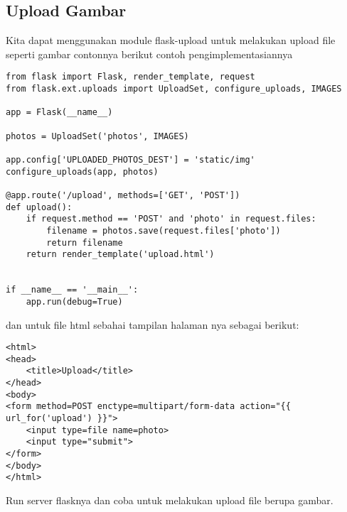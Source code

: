 \documentclass[12pt,a4paper]{article}
\begin{document}
\subsection{Upload Gambar}
Kita dapat menggunakan module flask-upload untuk melakukan upload file seperti gambar contonnya berikut contoh pengimplementasiannya
\begin{verbatim}
from flask import Flask, render_template, request
from flask.ext.uploads import UploadSet, configure_uploads, IMAGES

app = Flask(__name__)

photos = UploadSet('photos', IMAGES)

app.config['UPLOADED_PHOTOS_DEST'] = 'static/img'
configure_uploads(app, photos)

@app.route('/upload', methods=['GET', 'POST'])
def upload():
    if request.method == 'POST' and 'photo' in request.files:
        filename = photos.save(request.files['photo'])
        return filename
    return render_template('upload.html')


if __name__ == '__main__':
    app.run(debug=True)
\end{verbatim}
dan untuk file html sebahai tampilan halaman nya sebagai berikut:
\begin{verbatim}
<html>
<head>
    <title>Upload</title>
</head>
<body>
<form method=POST enctype=multipart/form-data action="{{ url_for('upload') }}">
    <input type=file name=photo>
    <input type="submit">
</form>
</body>
</html>
\end{verbatim}
Run server flasknya dan coba untuk melakukan upload file berupa gambar.
\end{document}
